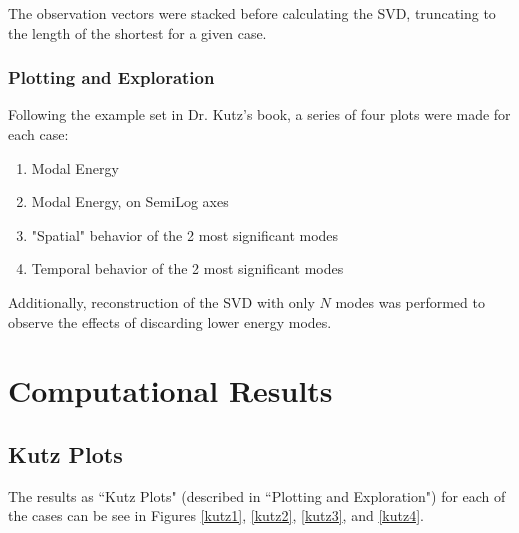 \documentclass[journal]{IEEEtran}
\begin{document}
The observation vectors were stacked before calculating the SVD, truncating to the length of the shortest for a given case.

\subsubsection{Plotting and Exploration}
Following the example set in Dr. Kutz's book, a series of four plots were made for each case:
\begin{enumerate}
	\item Modal Energy
	\item Modal Energy, on SemiLog axes
	\item "Spatial" behavior of the 2 most significant modes
	\item Temporal behavior of the 2 most significant modes
\end{enumerate}

Additionally, reconstruction of the SVD with only $N$ modes was performed to observe the effects of discarding lower energy modes.


\section{Computational Results}

\subsection{Kutz Plots}
The results as ``Kutz Plots" (described in ``Plotting and Exploration") for each of the cases can be see in Figures \ref{kutz1}, \ref{kutz2}, \ref{kutz3}, and \ref{kutz4}.
\end{document}
